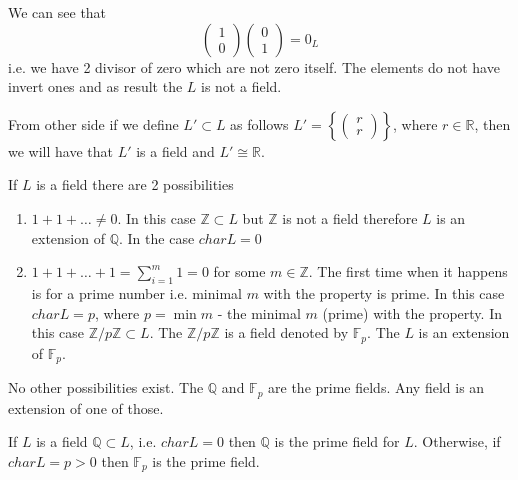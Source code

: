 \begin{example}
  We can see that
  \[
  \left(
  \begin{array}{c}
    1 \\
    0
  \end{array}
  \right)
  \left(
  \begin{array}{c}
    0 \\
    1
  \end{array}
  \right) = 0_L
  \]
  i.e. we have 2 divisor of zero which are not zero itself. The
  elements do not have invert ones and as result the $L$ is
  not a field.

  From other side if we define $L' \subset L$ as follows
  $L' = \left\{
  \left(
  \begin{array}{c}
    r \\
    r
  \end{array}
  \right)
  \right\}$, where $r \in \mathbb{R}$,
  then we will have that $L'$ is a field and $L' \cong \mathbb{R}$.
  \label{ex:kalgebranotfield}
\end{example}

\begin{definition}[Characteristic]
  \label{def:fieldcharacteristic}
  If $L$ is a field there are 2 possibilities
  \begin{enumerate}
  \item $1 + 1 + \dots \ne 0$. In this case
    $\mathbb{Z} \subset L$ but $\mathbb{Z}$ is not a field therefore $L$
    is an extension of $\mathbb{Q}$. In the case $char L = 0$
  \item $1 + 1 + \dots + 1 = \sum_{i = 1}^m 1 = 0$ for some $m \in
    \mathbb{Z}$. The first time when it happens is for a prime number
    i.e. minimal $m$ with the property is prime. In this case $char L
    = p$, where $p = \min m$  - the minimal $m$ (prime) with the
    property. In this 
    case $\mathbb{Z}/p\mathbb{Z} \subset L$. The
    $\mathbb{Z}/p\mathbb{Z}$ is a field denoted by $\mathbb{F}_p$. The
    $L$ is an extension of $\mathbb{F}_p$.
  \end{enumerate}
  No other possibilities exist. The $\mathbb{Q}$ and $\mathbb{F}_p$ are
  the prime fields. Any field is an extension of one of those.
\end{definition}

\begin{definition}
  \label{def:primefield}
  If $L$ is a field $\mathbb{Q} \subset L$, i.e. $char L = 0$ then
  $\mathbb{Q}$ is the prime field for $L$. Otherwise, if $char L = p > 0$
  then $\mathbb{F}_p$ is the prime field.
\end{definition}

